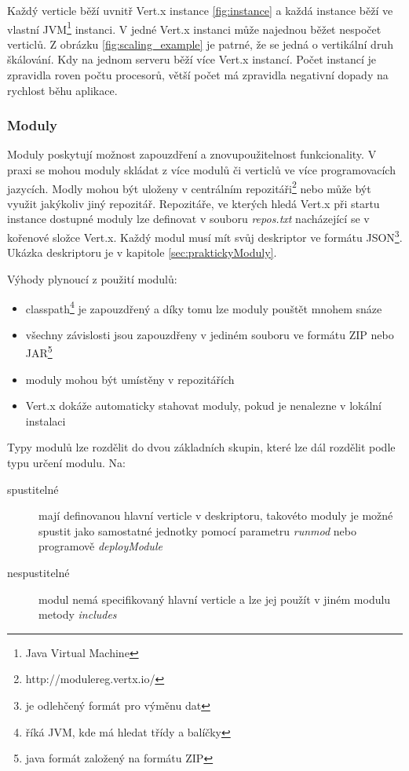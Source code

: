 Každý verticle běží uvnitř Vert.x instance \vref{fig:instance} a každá instance běží ve vlastní JVM\footnote{Java Virtual Machine} instanci. V jedné Vert.x instanci může najednou běžet nespočet verticlů. Z obrázku \ref{fig:scaling_example} je patrné, že se jedná o vertikální druh škálování. Kdy na jednom serveru běží více Vert.x instancí. Počet instancí je zpravidla roven počtu procesorů, větší počet má zpravidla negativní dopady na rychlost běhu aplikace.

\subsubsection{Moduly}\label{sub:moduly}

Moduly poskytují možnost zapouzdření a znovupoužitelnost funkcionality. V praxi se mohou moduly skládat z více modulů či verticlů ve více programovacích jazycích. Modly mohou být uloženy v centrálním repozitáři\footnote{http://modulereg.vertx.io/} nebo může být využit jakýkoliv jiný repozitář. Repozitáře, ve kterých hledá Vert.x při startu instance dostupné moduly lze definovat v souboru \emph{repos.txt} nacházející se v kořenové složce Vert.x. Každý modul musí mít svůj deskriptor ve formátu JSON\footnote{je odlehčený formát pro výměnu dat}. Ukázka deskriptoru je v kapitole \ref{sec:praktickyModuly}.

Výhody plynoucí z použití modulů:
\begin{itemize}
\item{classpath\footnote{říká JVM, kde má hledat třídy a balíčky} je zapouzdřený a díky tomu lze moduly pouštět mnohem snáze}
\item{všechny závislosti jsou zapouzdřeny v jediném souboru ve formátu ZIP nebo JAR\footnote{java formát založený na formátu ZIP}}
\item{moduly mohou být umístěny v repozitářích}
\item{Vert.x dokáže automaticky stahovat moduly, pokud je nenalezne v lokální instalaci}
\end{itemize}

Typy modulů lze rozdělit do dvou základních skupin, které lze dál rozdělit podle typu určení modulu. Na:

\begin{description}
\item[spustitelné]{mají definovanou hlavní verticle v deskriptoru, takovéto moduly je možné spustit jako samostatné jednotky pomocí parametru \emph{runmod} nebo programově \emph{deployModule} }
\item[nespustitelné]{modul nemá specifikovaný hlavní verticle a lze jej použít v jiném modulu  metody \emph{includes}}
\end{description}

